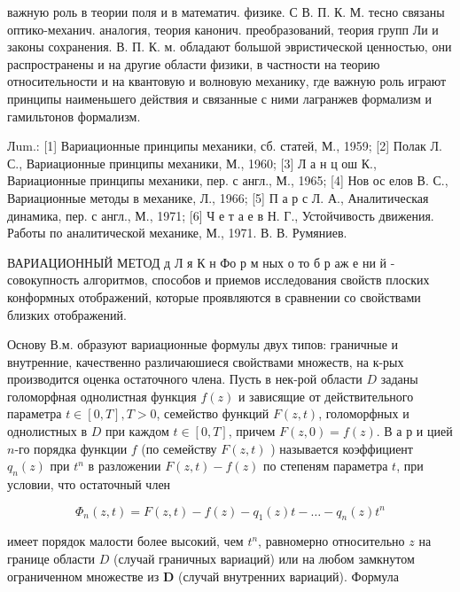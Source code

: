\documentclass[10pt]{article}
\begin{document}
важную роль в теории поля и в математич. физике. С В. П. К. М. тесно связаны оптико-механич. аналогия, теория канонич. преобразований, теория групп Ли и законы сохранения. В. П. К. м. обладают большой эвристической ценностью, они распространены и на другие области физики, в частности на теорию относительности и на квантовую и волновую механику, где важную роль играют принципы наименьшего действия и связанные с ними лагранжев формализм и гамильтонов формализм.



Лum.: [1] Вариационные принципы механики, сб. статей, М., 1959; [2] Полак Л. С., Вариационные принципы механики, М., 1960; [3] Л а н ц ош К., Вариационные принципы механики, пер. с англ., М., 1965; [4] Нов ос елов В. С., Вариационные методы в механике, Л., 1966; [5] П а р с Л. А., Аналитическая динамика, пер. с англ., М., 1971; [6] Ч е т а е в Н. Г., Устойчивость движения. Работы по аналитической механике, М., 1971. В. В. Румяниев.



ВАРИАЦИОННЫЙ МЕТОД д Л я К н Фо р м ных о то б р аж е ни й - совокупность алгоритмов, способов и приемов исследования свойств плоских конформных отображений, которые проявляются в сравнении со свойствами близких отображений.



Основу В.м. образуют вариационные формулы двух типов: граничные и внутренние, качественно различаюшиеся свойствами множеств, на к-рых производится оценка остаточного члена. Пусть в нек-рой области $D$ заданы голоморфная однолистная функция $f(z)$ и зависящие от действительного параметра $t \in[0, T], T>0$, семейство функций $F(z, t)$, голоморфных и однолистных в $D$ при каждом $t \in[0, T]$, причем $F(z, 0)=f(z)$. В а р и цией $n$-го порядка функции $f$ (по семейству $F(z, t)$ ) называется коэффициент $q_{n}(z)$ при $t^{n}$ в разложении $F(z, t)-f(z)$ по степеням параметра $t$, при условии, что остаточный член



\[

\Phi_{n}(z, t)=F(z, t)-f(z)-q_{1}(z) t-\ldots-q_{n}(z) t^{n}

\]



имеет порядок малости более высокий, чем $t^{n}$, равномерно относительно $z$ на границе области $D$ (случай граничных вариаций) или на любом замкнутом ограниченном множестве из $\boldsymbol{D}$ (случай внутренних вариаций). Формула
\end{document}
